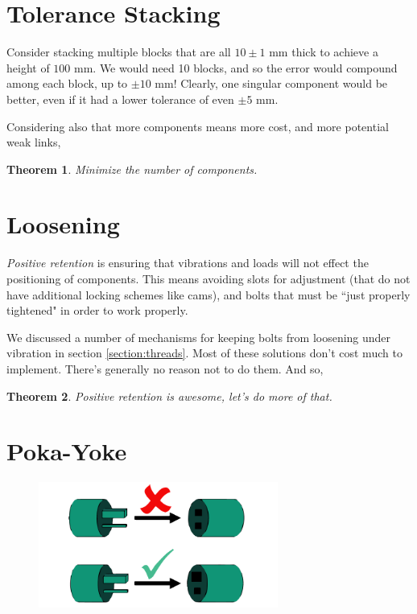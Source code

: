\documentclass[10pt,letterpaper]{book}
\newtheorem{theorem}{Theorem}
\begin{document}
\section{Tolerance Stacking}

Consider stacking multiple blocks that are all $10 \pm 1$ mm thick to achieve a height of $100$ mm. We would need 10 blocks, and so the error would compound among each block, up to $\pm 10$ mm! Clearly, one singular component would be better, even if it had a lower tolerance of even $\pm 5$ mm.

Considering also that more components means more cost, and more potential weak links,

\begin{theorem}
Minimize the number of components.
\end{theorem}

\section{Loosening}

\textit{Positive retention} is ensuring that vibrations and loads will not effect the positioning of components. This means avoiding slots for adjustment (that do not have additional locking schemes like cams), and bolts that must be ``just properly tightened" in order to work properly.

We discussed a number of mechanisms for keeping bolts from loosening under vibration in section \ref{section:threads}. Most of these solutions don't cost much to implement. There's generally no reason not to do them. And so,

\begin{theorem}
Positive retention is awesome, let's do more of that.
\end{theorem}

\section{Poka-Yoke}

\begin{figure}[H]
	\includegraphics[width=0.7\textwidth]{imgs/poka_yoke.png}
\end{figure}
\end{document}
